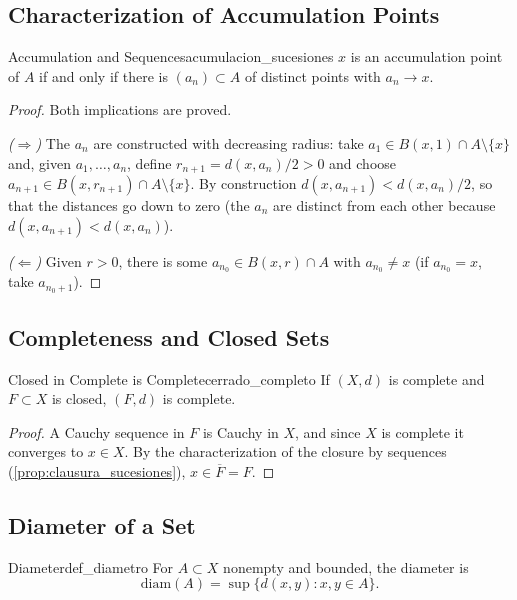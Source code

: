 \documentclass[11pt, a4paper]{article}
\begin{document}
\subsection{Characterization of Accumulation Points}

\begin{proposicion}{Accumulation and Sequences}{acumulacion_sucesiones}
$x$ is an accumulation point of $A$ if and only if there is $(a_n) \subset A$ of distinct points with
$a_n \to x$.
\end{proposicion}

\begin{proof}
Both implications are proved.

\textit{($\Rightarrow$)} The $a_n$ are constructed with decreasing radius: take
$a_1 \in B(x, 1) \cap A \setminus \{x\}$ and, given $a_1, \dots, a_n$, define
$r_{n+1} = d(x, a_n)/2 > 0$ and choose $a_{n+1} \in B(x, r_{n+1}) \cap A \setminus \{x\}$. By
construction $d(x, a_{n+1}) < d(x, a_n)/2$, so that the distances go down to zero (the $a_n$ are
distinct from each other because $d(x, a_{n+1}) < d(x, a_n)$).

\textit{($\Leftarrow$)} Given $r > 0$, there is some $a_{n_0} \in B(x, r) \cap A$ with $a_{n_0} \ne x$ (if
$a_{n_0} = x$, take $a_{n_0+1}$).
\end{proof}

\subsection{Completeness and Closed Sets}

\begin{proposicion}{Closed in Complete is Complete}{cerrado_completo}
If $(X, d)$ is complete and $F \subset X$ is closed, $(F, d)$ is complete.
\end{proposicion}

\begin{proof}
A Cauchy sequence in $F$ is Cauchy in $X$, and since $X$ is complete it converges to $x \in X$.
By the characterization of the closure by sequences (\ref{prop:clausura_sucesiones}),
$x \in \overline{F} = F$.
\end{proof}

\subsection{Diameter of a Set}

\begin{definicion}{Diameter}{def_diametro}
For $A \subset X$ nonempty and bounded, the diameter is
$$ \mathrm{diam}(A) = \sup \{ d(x, y) : x, y \in A \}. $$
\end{definicion}
\end{document}
